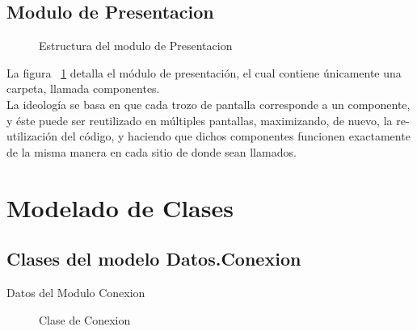     
    \subsection{Modulo de Presentacion}
    \begin{figure}[htbp!]
    	\begin{center}
    		\caption{Estructura del modulo de Presentacion}
    		\label{fig:presentacion}
    	\end{center}
    \end{figure}
        
    La figura ~\ref{fig:presentacion} detalla el módulo de presentación, el cual contiene únicamente una carpeta, llamada componentes. \\
    La ideología se basa en que cada trozo de pantalla corresponde a un componente, y éste puede ser reutilizado en múltiples pantallas, maximizando, de nuevo, la re-utilización del código, y haciendo que dichos componentes funcionen exactamente de la misma manera en cada sitio de donde sean llamados.
\section{Modelado de Clases}	

\subsection{Clases del modelo Datos.Conexion}
    Datos del Modulo Conexion
    
    \begin{figure}[htbp!]
    	\begin{center}
    		\caption{Clase de Conexion}
    		\label{fig:conexion}
    	\end{center}
    \end{figure}
    
